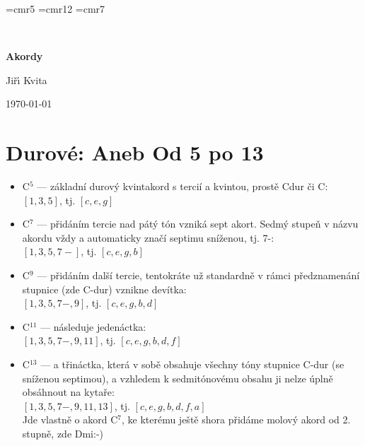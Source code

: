 \documentclass[12pt]{article}
\newcommand\mychords{
\def\chordsize{2.2mm}   %
\def\numfrets{7}
\font\fingerfont=cmr5  %
\font\namefont=cmr12    %
\font\fretposfont=cmr7  %
\def\dampsymbol{{\tiny$\scriptstyle\times$}} %
}
\begin{document}
\mychords


{\Large
\begin{center}
{ \ }
\vskip2cm
\centerline{ \textbf{Akordy}}
\vskip2cm
\centerline{Ji\v{r}\'{\i} Kvita}
\vskip1cm
\centerline{\small \today}
\end{center}
}
\vskip2cm


\tableofcontents

\newpage
\section{Durové: Aneb Od 5 po 13}


\begin{itemize}

\item C${}^{5}$ --- základní durový kvintakord s tercií a kvintou, prostě Cdur či C:
  \\ $[1,3,5]$, tj. $[c,e,g]$

\item C${}^{7}$ --- přidáním tercie nad pátý tón vzniká sept akort. Sedmý stupeň v názvu akordu vždy a automaticky značí septimu sníženou, tj. 7-:
  \\ $[1,3,5,7-]$, tj. $[c,e,g,b]$

\item C${}^{9}$ --- přidáním další tercie, tentokráte už standardně v rámci předznamenání stupnice (zde C-dur) vznikne devítka: 
  \\ $[1,3,5,7-,9]$, tj. $[c,e,g,b,d]$

\item C${}^{11}$ --- následuje jedenáctka:
  \\ $[1,3,5,7-,9,11]$, tj. $[c,e,g,b,d,f]$

\item C${}^{13}$ --- a třináctka, která v sobě obsahuje všechny tóny stupnice C-dur (se sníženou septimou), a vzhledem k sedmitónovému obsahu ji nelze úplně obsáhnout na kytaře:
  \\ $[1,3,5,7-,9,11,13]$, tj. $[c,e,g,b,d,f,a]$
  \\ Jde vlastně o akord C${}^7$, ke kterému ještě shora přidáme molový akord od 2. stupně, zde Dmi:-)
\end{itemize}
\end{document}
